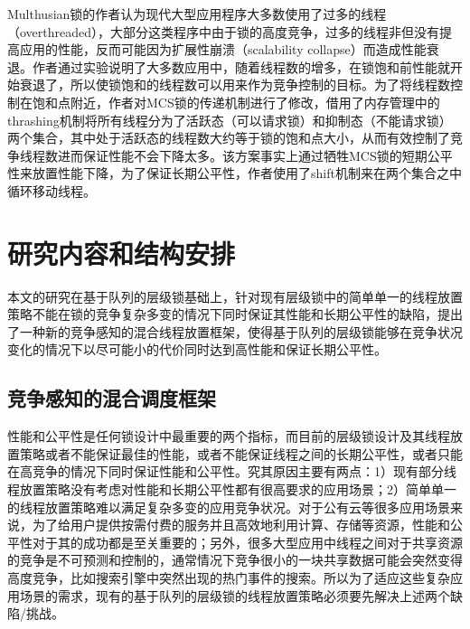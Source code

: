 Multhusian锁\cite{dice2017malthusian}的作者认为现代大型应用程序大多数使用了过多的线程（overthreaded），大部分这类程序中由于锁的高度竞争，过多的线程非但没有提高应用的性能，反而可能因为扩展性崩溃（scalability collapse）而造成性能衰退。作者通过实验说明了大多数应用中，随着线程数的增多，在锁饱和前性能就开始衰退了，所以使锁饱和的线程数可以用来作为竞争控制的目标。为了将线程数控制在饱和点附近，作者对MCS锁的传递机制进行了修改，借用了内存管理中的thrashing机制\cite{denning1980working}将所有线程分为了活跃态（可以请求锁）和抑制态（不能请求锁）两个集合，其中处于活跃态的线程数大约等于锁的饱和点大小，从而有效控制了竞争线程数进而保证性能不会下降太多。该方案事实上通过牺牲MCS锁的短期公平性来放置性能下降，为了保证长期公平性，作者使用了shift机制来在两个集合之中循环移动线程。

\section{研究内容和结构安排}
本文的研究在基于队列的层级锁基础上，针对现有层级锁中的简单单一的线程放置策略不能在锁的竞争复杂多变的情况下同时保证其性能和长期公平性的缺陷，提出了一种新的竞争感知的混合线程放置框架，使得基于队列的层级锁能够在竞争状况变化的情况下以尽可能小的代价同时达到高性能和保证长期公平性。


\subsection{竞争感知的混合调度框架}
性能和公平性是任何锁设计中最重要的两个指标，而目前的层级锁设计及其线程放置策略或者不能保证最佳的性能，或者不能保证线程之间的长期公平性，或者只能在高竞争的情况下同时保证性能和公平性。究其原因主要有两点：1）现有部分线程放置策略没有考虑对性能和长期公平性都有很高要求的应用场景；2）简单单一的线程放置策略难以满足复杂多变的应用竞争状况。对于公有云等很多应用场景来说，为了给用户提供按需付费的服务并且高效地利用计算、存储等资源，性能和公平性对于其的成功都是至关重要的\cite{rao2014towards}；另外，很多大型应用中线程之间对于共享资源的竞争是不可预测和控制的，通常情况下竞争很小的一块共享数据可能会突然变得高度竞争，比如搜索引擎中突然出现的热门事件的搜索\cite{chabbi2016contention}。所以为了适应这些复杂应用场景的需求，现有的基于队列的层级锁的线程放置策略必须要先解决上述两个缺陷/挑战。

